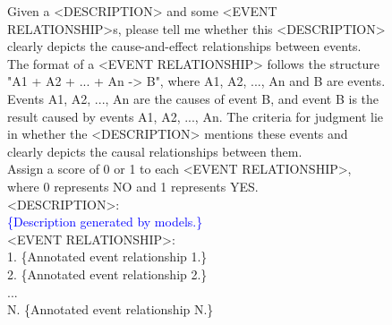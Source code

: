 \begin{figure}[h!]
  \begin{tcolorbox}[
      colframe = blue!30!white, 
      colback = blue!2!white,
      colbacktitle = blue!10!white,
      colupper = black, 
      collower = yellow!75!red,
      coltitle = black!90!white]
      \small
      Given a <DESCRIPTION> and some <EVENT RELATIONSHIP>s, please tell me whether this <DESCRIPTION> clearly depicts the cause-and-effect relationships between events. \\

      The format of a <EVENT RELATIONSHIP> follows the structure "A1 + A2 + ... + An -> B", where A1, A2, ..., An and B are events. Events A1, A2, ..., An are the causes of event B, and event B is the result caused by events A1, A2, ..., An. The criteria for judgment lie in whether the <DESCRIPTION> mentions these events and clearly depicts the causal relationships between them. \\

      Assign a score of 0 or 1 to each <EVENT RELATIONSHIP>, where 0 represents NO and 1 represents YES. \\

      {<DESCRIPTION>:} \\
      \textcolor{blue}{\{Description generated by models.\}} \\

      {<EVENT RELATIONSHIP>:} \\
      \textcolor{c2}{1. \{Annotated event relationship 1.\}} \\
      \textcolor{c2}{2. \{Annotated event relationship 2.\}} \\
      \textcolor{c2}{...} \\
      \textcolor{c2}{N. \{Annotated event relationship N.\}} \\


\end{tcolorbox}
\end{figure}
